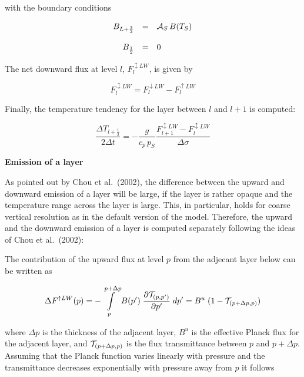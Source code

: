 with the boundary conditions

\begin{equation}
\begin{array}{rcl}
\displaystyle B_{L+\frac{3}{2}}& = & \displaystyle {\cal A}_S \,
B(T_S) \\
&&\\
\displaystyle B_{\frac{1}{2}} & = & \displaystyle 0
\end{array}
\end{equation}

The net downward flux at
level
$l$, $F_l^{\updownarrow LW}$, is given by

\begin{equation}
F_l^{\updownarrow LW}=F_l^{\downarrow LW}-F_l^{\uparrow LW}
\end{equation}

Finally, the temperature tendency for the layer between
$l$ and $l+1$ is computed:

\begin{equation}
\frac{\Delta T_{l+\frac{1}{2}}}{2\Delta t} = -
\frac{g}{c_p
\, p_S}\frac{F_{l+1}^{\updownarrow LW}-F_{l}^{\updownarrow LW}}{\Delta
\sigma}   
\end{equation}

{\bf Emission of a layer}

As pointed out by Chou et al.~(2002), the difference between the upward and downward
emission of a layer will be large, if the layer is rather opaque and the temperature range across
the layer is large. This, in particular, holds for coarse vertical resolution as in the default version
of the model. Therefore, the upward and the downward emission of a layer is computed
separately following the ideas of Chou et al.~(2002):

The contribution of the upward flux at level $p$ from the adjecant layer below can be written as

\begin{equation} \label{FUPLW}
\Delta F^{\uparrow LW}(p) = -\int\limits^{p+\Delta p}_{p} B(p^{\prime}) \; \frac{\partial
{\cal T}_{(p,p^{\prime})}}{\partial p^{\prime}} \; dp^{\prime} = B^u \; (1-{\cal T}_{
(p+\Delta p, p)})
\end{equation}

where $\Delta p$ is the thickness of the adjacent layer, $B^u$ is the effective Planck flux for the
adjacent layer, and  ${\cal T}_{(p+\Delta p, p)}$ is the flux transmittance between $p$ and $p
+\Delta p$. Assuming that the Planck function varies linearly with pressure and the
transmittance decreases exponentially with pressure away from $p$ it follows

